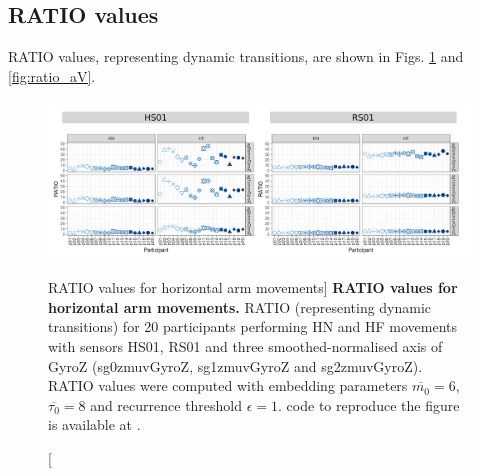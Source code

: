 


\newpage
\subsection{RATIO values}
RATIO values, representing dynamic transitions, 
are shown in Figs. \ref{fig:ratio_aH} and \ref{fig:ratio_aV}.


\begin{figure}
\centering
\includegraphics[width=1.0\textwidth]{ratio_aH}
    \caption
	[RATIO values for horizontal arm movements]{
	{\bf RATIO values for horizontal arm movements.}
	RATIO (representing dynamic transitions) for 
	20 participants performing HN and HF movements
	with sensors HS01, RS01 and three smoothed-normalised axis 
	of GyroZ (sg0zmuvGyroZ, sg1zmuvGyroZ and sg2zmuvGyroZ).
	RATIO values were computed with 
	embedding parameters $\overline{m_0}=6$, $\overline{\tau_0}=8$ and
	recurrence threshold $\epsilon=1$.
	\R code to reproduce the figure is available at 
	.
        }
    \label{fig:ratio_aH}
\end{figure}
